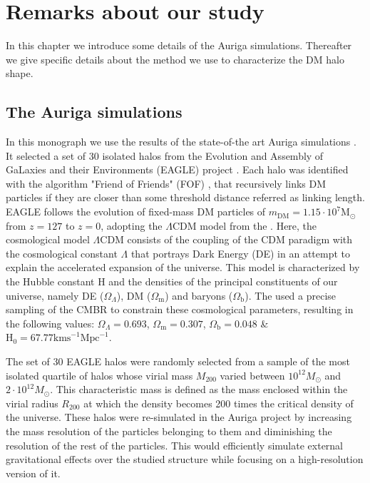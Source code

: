 \chapter{Remarks about our study}
In this chapter we introduce some details of the Auriga simulations. Thereafter we give specific details about the method we use to characterize the DM halo shape.\\

\section{The Auriga simulations}
In this monograph we use the results of the state-of-the art Auriga simulations \cite{auriga}. It selected a set of 30 isolated halos from the Evolution and Assembly of GaLaxies and their Environments (EAGLE) project \cite{Eagle}. Each halo was identified with the algorithm "Friend of Friends" (FOF) \cite{Davis_et_al._1985}, that recursively links DM particles if they are closer than some threshold distance referred as linking length. EAGLE follows the evolution of fixed-mass DM particles of $m_{\text{DM}} = 1.15\cdot 10^7\text{M}_{\odot}$ from $z=127$ to $z=0$, adopting the $\Lambda$CDM model from the \cite[Planck Collaboration et al. (2014)]{Planck_Collaboration_2014}. Here, the cosmological model $\Lambda$CDM consists of the coupling of the CDM paradigm with the cosmological constant $\Lambda$ that portrays Dark Energy (DE) in an attempt to explain the accelerated expansion of the universe. This model is characterized by the Hubble constant $\text{H}$ and the densities of the principal constituents of our universe, namely DE ($\Omega_\Lambda$), DM ($\Omega_\text{m}$) and baryons ($\Omega_\text{b}$). The \cite[Planck Collaboration et al. (2014)]{Planck_Collaboration_2014} used a precise sampling of the CMBR to constrain these cosmological parameters, resulting in the following values: $\Omega_\Lambda=0.693$, $\Omega_\text{m}=0.307$, $\Omega_\text{b}=0.048$ \& $\text{H}_0=67.77\text{kms} ^{-1}\text{Mpc}^{-1}$. 

The set of 30 EAGLE halos were randomly selected from a sample of the most isolated quartile of halos whose virial mass $M_{200}$ varied between $10^{12}M_\odot$ and $2\cdot 10^{12}M_\odot$. This characteristic mass is defined as the mass enclosed within the virial radius $R_{200}$ at which the density becomes 200 times the critical density of the universe. These halos were re-simulated in the Auriga project by increasing the mass resolution of the particles belonging to them and diminishing the resolution of the rest of the particles. This would efficiently simulate external gravitational effects over the studied structure while focusing on a high-resolution version of it.\\

